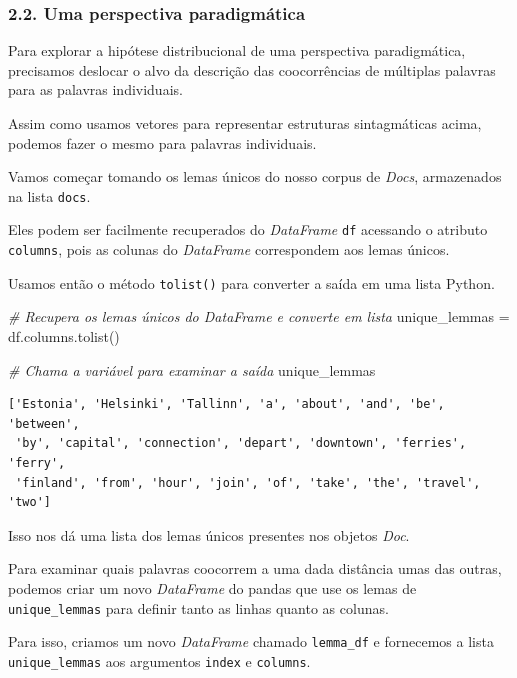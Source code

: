 \documentclass[
  brazilian,
]{article}
\newenvironment{Shaded}{}{}
\newcommand{\CommentTok}[1]{\textcolor[rgb]{0.38,0.63,0.69}{\textit{#1}}}
\newcommand{\NormalTok}[1]{#1}
\newcommand{\OperatorTok}[1]{\textcolor[rgb]{0.40,0.40,0.40}{#1}}
\begin{document}
\hypertarget{uma-perspectiva-paradigmuxe1tica}{%
\subsubsection{2.2. Uma perspectiva
paradigmática}\label{uma-perspectiva-paradigmuxe1tica}}

Para explorar a hipótese distribucional de uma perspectiva
paradigmática, precisamos deslocar o alvo da descrição das coocorrências
de múltiplas palavras para as palavras individuais.

Assim como usamos vetores para representar estruturas sintagmáticas
acima, podemos fazer o mesmo para palavras individuais.

Vamos começar tomando os lemas únicos do nosso corpus de \emph{Docs},
armazenados na lista \texttt{docs}.

Eles podem ser facilmente recuperados do \emph{DataFrame} \texttt{df}
acessando o atributo \texttt{columns}, pois as colunas do
\emph{DataFrame} correspondem aos lemas únicos.

Usamos então o método \texttt{tolist()} para converter a saída em uma
lista Python.

\begin{Shaded}
\begin{Highlighting}[]
\CommentTok{\# Recupera os lemas únicos do DataFrame e converte em lista}
\NormalTok{unique\_lemmas }\OperatorTok{=}\NormalTok{ df.columns.tolist()}

\CommentTok{\# Chama a variável para examinar a saída}
\NormalTok{unique\_lemmas}
\end{Highlighting}
\end{Shaded}

\begin{verbatim}
['Estonia', 'Helsinki', 'Tallinn', 'a', 'about', 'and', 'be', 'between',
 'by', 'capital', 'connection', 'depart', 'downtown', 'ferries', 'ferry',
 'finland', 'from', 'hour', 'join', 'of', 'take', 'the', 'travel', 'two']
\end{verbatim}

Isso nos dá uma lista dos lemas únicos presentes nos objetos \emph{Doc}.

Para examinar quais palavras coocorrem a uma dada distância umas das
outras, podemos criar um novo \emph{DataFrame} do pandas que use os
lemas de \texttt{unique\_lemmas} para definir tanto as linhas quanto as
colunas.

Para isso, criamos um novo \emph{DataFrame} chamado \texttt{lemma\_df} e
fornecemos a lista \texttt{unique\_lemmas} aos argumentos \texttt{index}
e \texttt{columns}.
\end{document}
